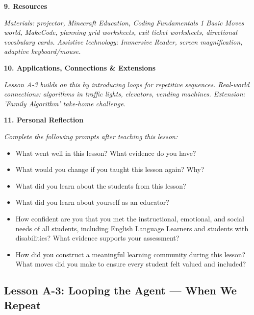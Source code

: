 \documentclass[11pt,letterpaper]{article}
\begin{document}
\textbf{9. Resources}

\textit{Materials: projector, Minecraft Education, Coding Fundamentals 1 Basic Moves world, MakeCode, planning grid worksheets, exit ticket worksheets, directional vocabulary cards. Assistive technology: Immersive Reader, screen magnification, adaptive keyboard/mouse.}

\textbf{10. Applications, Connections \& Extensions}

\textit{Lesson A-3 builds on this by introducing loops for repetitive sequences. Real-world connections: algorithms in traffic lights, elevators, vending machines. Extension: 'Family Algorithm' take-home challenge.}

\textbf{11. Personal Reflection}

\textit{Complete the following prompts after teaching this lesson:}

\begin{itemize}
  \item What went well in this lesson? What evidence do you have?

  \item What would you change if you taught this lesson again? Why?

  \item What did you learn about the students from this lesson?

  \item What did you learn about yourself as an educator?

  \item How confident are you that you met the instructional, emotional, and social needs of all students, including English Language Learners and students with disabilities? What evidence supports your assessment?

  \item How did you construct a meaningful learning community during this lesson? What moves did you make to ensure every student felt valued and included?
\end{itemize}

\newpage
\subsection{Lesson A-3: Looping the Agent --- When We Repeat}
\label{sub:LessonA3LoopingtheAgentWhenWeRepeat}
\end{document}
